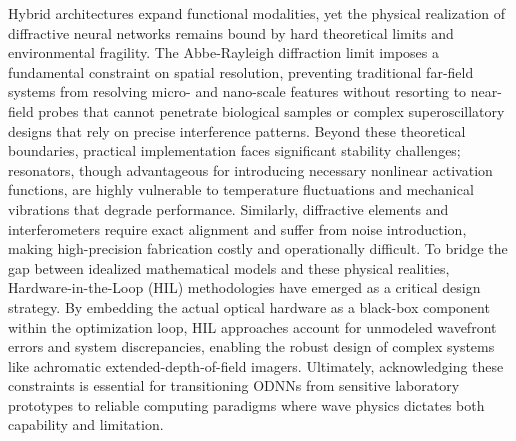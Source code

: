 Hybrid architectures expand functional modalities, yet the physical realization of diffractive neural networks remains bound by hard theoretical limits and environmental fragility. The Abbe-Rayleigh diffraction limit imposes a fundamental constraint on spatial resolution, preventing traditional far-field systems from resolving micro- and nano-scale features without resorting to near-field probes that cannot penetrate biological samples or complex superoscillatory designs that rely on precise interference patterns. Beyond these theoretical boundaries, practical implementation faces significant stability challenges; resonators, though advantageous for introducing necessary nonlinear activation functions, are highly vulnerable to temperature fluctuations and mechanical vibrations that degrade performance. Similarly, diffractive elements and interferometers require exact alignment and suffer from noise introduction, making high-precision fabrication costly and operationally difficult. To bridge the gap between idealized mathematical models and these physical realities, Hardware-in-the-Loop (HIL) methodologies have emerged as a critical design strategy. By embedding the actual optical hardware as a black-box component within the optimization loop, HIL approaches account for unmodeled wavefront errors and system discrepancies, enabling the robust design of complex systems like achromatic extended-depth-of-field imagers. Ultimately, acknowledging these constraints is essential for transitioning ODNNs from sensitive laboratory prototypes to reliable computing paradigms where wave physics dictates both capability and limitation. \citep{doi_10_3390_nano14080697_c372a140} \citep{doi_10_1364_oe_461549_b2d41b3f} \citep{doi_10_1117_1_ap_6_5_056004_3f240d06}

